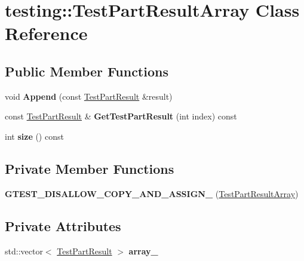 \hypertarget{classtesting_1_1_test_part_result_array}{}\section{testing\+:\+:Test\+Part\+Result\+Array Class Reference}
\label{classtesting_1_1_test_part_result_array}
\subsection*{Public Member Functions}
\begin{DoxyCompactItemize}
\item 
\mbox{\label{classtesting_1_1_test_part_result_array_a01844bd505b18a666324617a1b459558}} 
void {\bfseries Append} (const \hyperlink{classtesting_1_1_test_part_result}{Test\+Part\+Result} \&result)
\item 
\mbox{\label{classtesting_1_1_test_part_result_array_ad5f97a52a36f120fa08fa9638901740e}} 
const \hyperlink{classtesting_1_1_test_part_result}{Test\+Part\+Result} \& {\bfseries Get\+Test\+Part\+Result} (int index) const
\item 
\mbox{\label{classtesting_1_1_test_part_result_array_a31555f11ba42b81ddad0a26a87710d0a}} 
int {\bfseries size} () const
\end{DoxyCompactItemize}
\subsection*{Private Member Functions}
\begin{DoxyCompactItemize}
\item 
\mbox{\label{classtesting_1_1_test_part_result_array_a2f4ea91cd0d12104d9a476a0f0c5b7fe}} 
{\bfseries G\+T\+E\+S\+T\+\_\+\+D\+I\+S\+A\+L\+L\+O\+W\+\_\+\+C\+O\+P\+Y\+\_\+\+A\+N\+D\+\_\+\+A\+S\+S\+I\+G\+N\+\_\+} (\hyperlink{classtesting_1_1_test_part_result_array}{Test\+Part\+Result\+Array})
\end{DoxyCompactItemize}
\subsection*{Private Attributes}
\begin{DoxyCompactItemize}
\item 
\mbox{\label{classtesting_1_1_test_part_result_array_a288da4fd16773d079722d6824a63060f}} 
std\+::vector$<$ \hyperlink{classtesting_1_1_test_part_result}{Test\+Part\+Result} $>$ {\bfseries array\+\_\+}
\end{DoxyCompactItemize}


